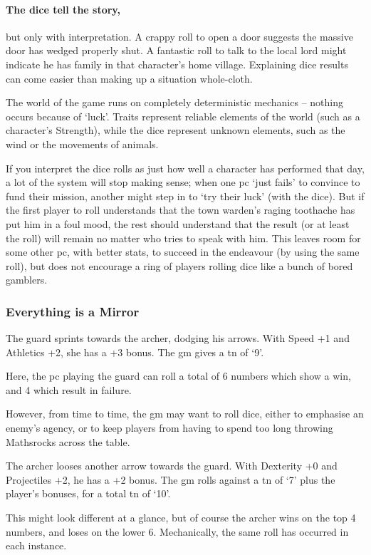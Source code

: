 \begin{multicols}{2}
\paragraph{The dice tell the story,} but only with interpretation.
A crappy roll to open a door suggests the massive door has wedged properly shut.
A fantastic roll to talk to the local lord might indicate he has family in that character's home \gls{village}.
Explaining dice results can come easier than making up a situation whole-cloth.

The world of the game runs on completely deterministic mechanics -- nothing occurs because of `luck'.
Traits represent reliable elements of the world (such as a character's Strength), while the dice represent unknown elements, such as the wind or the movements of animals.

If you interpret the dice rolls as just how well a character has performed that day, a lot of the system will stop making sense; when one \gls{pc} `just fails' to convince  to fund their mission, another might step in to `try their luck' (with the dice).
But if the first player to roll understands that the town \gls{warden}'s raging toothache has put him in a foul mood, the rest should understand that the result (or at least the roll) will remain no matter who tries to speak with him.
This leaves room for some other \gls{pc}, with better stats, to succeed in the endeavour (by using the same roll), but does not encourage a ring of players rolling dice like a bunch of bored gamblers.

\subsubsection{Everything is a Mirror}

\begin{exampletext}
  The guard sprints towards the archer, dodging his arrows.
  With Speed +1 and Athletics +2, she has a +3 bonus.
  The \gls{gm} gives a \gls{tn} of `9'.
\end{exampletext}

\noindent
Here, the \gls{pc} playing the guard can roll a total of 6 numbers which show a win, and 4 which result in failure.

However, from time to time, the \gls{gm} may want to roll dice, either to emphasise an enemy's agency, or to keep players from having to spend too long throwing Mathsrocks across the table.

\begin{exampletext}
  The archer looses another arrow towards the guard.
  With Dexterity +0 and Projectiles +2, he has a +2 bonus.
  The \gls{gm} rolls against a \gls{tn} of `7' plus the player's bonuses, for a total \gls{tn} of `10'.
\end{exampletext}

\noindent
This might look different at a glance, but of course the archer wins on the top 4 numbers, and loses on the lower 6.
Mechanically, the same roll has occurred in each instance.

\end{multicols}

